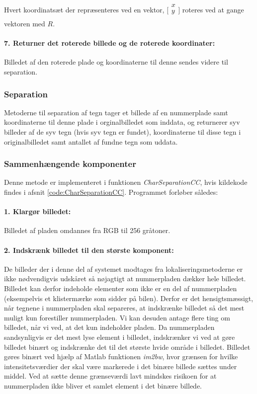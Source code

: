 Hvert koordinatsæt der repræsenteres ved en vektor, $\biggl[\begin{array}{c} x\\ y\\ \end{array}\biggr]$ roteres ved at gange vektoren med $R$.

\paragraph{7. Returner det roterede billede og de roterede koordinater:} Billedet af den roterede plade og koordinaterne til denne sendes videre til separation.

\subsubsection{Separation}

Metoderne til separation af tegn tager et billede af en nummerplade samt koordinaterne til denne plade i orginalbilledet som inddata, og returnerer syv billeder af de syv tegn (hvis syv tegn er fundet), koordinaterne til disse tegn i originalbilledet samt antallet af fundne tegn som uddata.

\subsubsection*{Sammenhængende komponenter}

Denne metode er implementeret i funktionen \textit{CharSeparationCC}, hvis kildekode findes i afsnit \vref{code:CharSeparationCC}. Programmet forløber således:

\paragraph{1. Klargør billedet:} Billedet af pladen omdannes fra RGB til 256 gråtoner.

\paragraph{2. Indskrænk billedet til den største komponent:}
De billeder der i denne del af systemet modtages fra lokaliseringsmetoderne er ikke nødvendigvis udskåret så nøjagtigt at nummerpladen dækker hele billedet. Billedet kan derfor indeholde elementer som ikke er en del af nummerpladen (eksempelvis et klistermærke som sidder på bilen). Derfor er det hensigtsmæssigt, når tegnene i nummerpladen skal separeres, at indskrænke billedet så det mest muligt kun forestiller nummerpladen. Vi kan desuden antage flere ting om billedet, når vi ved, at det kun indeholder pladen. Da nummerpladen sandsynligvis er det mest lyse element i billedet, indskrænker vi ved at gøre billedet binært og indskrænke det til det største hvide område i billedet. Billedet gøres binært ved hjælp af Matlab funktionen \textit{im2bw}, hvor grænsen for hvilke intensitetsværdier der skal være markerede i det binære billede sættes under middel. Ved at sætte denne grænseværdi lavt mindskes risikoen for at nummerpladen ikke bliver et samlet element i det binære billede.


